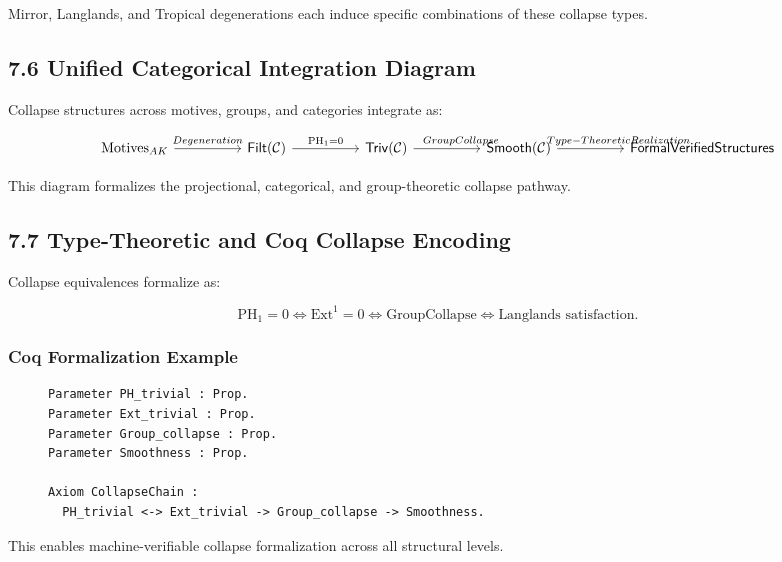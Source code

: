 \documentclass[11pt]{article}
\begin{document}
Mirror, Langlands, and Tropical degenerations each induce specific combinations of these collapse types.

\subsection*{7.6 Unified Categorical Integration Diagram}

Collapse structures across motives, groups, and categories integrate as:

\[
\begin{tikzcd}[column sep=huge]
\mathrm{Motives}_{AK} \arrow[r, "Degeneration"]
& \mathsf{Filt}(\mathcal{C}) \arrow[r, "\mathrm{PH}_1 = 0"]
& \mathsf{Triv}(\mathcal{C}) \arrow[r, "\hspace{2em}Group Collapse"]
& \mathsf{Smooth}(\mathcal{C}) \arrow[r, "\hspace{4em}Type-Theoretic Realization"]
& \mathsf{Formal Verified Structures}
\end{tikzcd}
\]

This diagram formalizes the projectional, categorical, and group-theoretic collapse pathway.

\subsection*{7.7 Type-Theoretic and Coq Collapse Encoding}

Collapse equivalences formalize as:

\[
\mathrm{PH}_1 = 0 \iff \mathrm{Ext}^1 = 0 \iff \text{GroupCollapse} \iff \text{Langlands satisfaction}.
\]

\subsubsection*{Coq Formalization Example}

\begin{figure}[h]
\centering
\begin{lstlisting}[language=Coq, caption=Collapse Typing and Group Collapse Schema]
Parameter PH_trivial : Prop.
Parameter Ext_trivial : Prop.
Parameter Group_collapse : Prop.
Parameter Smoothness : Prop.

Axiom CollapseChain :
  PH_trivial <-> Ext_trivial -> Group_collapse -> Smoothness.
\end{lstlisting}
\end{figure}


This enables machine-verifiable collapse formalization across all structural levels.
\end{document}
